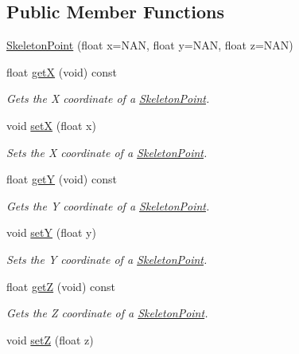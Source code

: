 \subsection*{\-Public \-Member \-Functions}
\begin{DoxyCompactItemize}
\item 
\hyperlink{class_skeleton_point_ac8c9f0e9d94a6ada396a142ee8c49665}{\-Skeleton\-Point} (float x=\-N\-A\-N, float y=\-N\-A\-N, float z=\-N\-A\-N)
\item 
float \hyperlink{class_skeleton_point_a779acc0e2776676ffd88b668ee31d708}{get\-X} (void) const 
\begin{DoxyCompactList}\small\item\em \-Gets the \-X coordinate of a \hyperlink{class_skeleton_point}{\-Skeleton\-Point}. \end{DoxyCompactList}\item 
void \hyperlink{class_skeleton_point_a46ef0257634b31d9e903312f8928b0fc}{set\-X} (float x)
\begin{DoxyCompactList}\small\item\em \-Sets the \-X coordinate of a \hyperlink{class_skeleton_point}{\-Skeleton\-Point}. \end{DoxyCompactList}\item 
float \hyperlink{class_skeleton_point_a15d09eb8ec414d4e5fda04bad78d2c9b}{get\-Y} (void) const 
\begin{DoxyCompactList}\small\item\em \-Gets the \-Y coordinate of a \hyperlink{class_skeleton_point}{\-Skeleton\-Point}. \end{DoxyCompactList}\item 
void \hyperlink{class_skeleton_point_a14814e39ce3e2d20b1a222ce538bac35}{set\-Y} (float y)
\begin{DoxyCompactList}\small\item\em \-Sets the \-Y coordinate of a \hyperlink{class_skeleton_point}{\-Skeleton\-Point}. \end{DoxyCompactList}\item 
float \hyperlink{class_skeleton_point_aa2c6c08abe6e55e092603555ff0a80ae}{get\-Z} (void) const 
\begin{DoxyCompactList}\small\item\em \-Gets the \-Z coordinate of a \hyperlink{class_skeleton_point}{\-Skeleton\-Point}. \end{DoxyCompactList}\item 
void \hyperlink{class_skeleton_point_a3c6d6b0453fa3edde10f5324170348b9}{set\-Z} (float z)

\end{DoxyCompactItemize}
